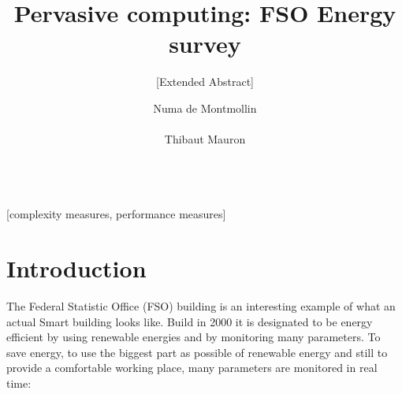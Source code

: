 \documentclass{acm_proc_article-sp}
\begin{document}
\title{Pervasive computing: FSO Energy survey}
\subtitle{[Extended Abstract]}

%
\author{
%
%
\alignauthor
Numa de Montmollin\\
       \\
\alignauthor
Thibaut Mauron\\
       \\
}

\maketitle
\begin{abstract}

\end{abstract}

[complexity measures, performance measures]



\section{Introduction}
The Federal Statistic Office (FSO) building is an interesting example of what an actual Smart building looks like. Build in 2000 it is designated to be energy efficient by using renewable energies and by monitoring many parameters. To save energy, to use the biggest part as possible of renewable energy and still to provide a comfortable working place, many parameters are monitored in real time:
\end{document}
